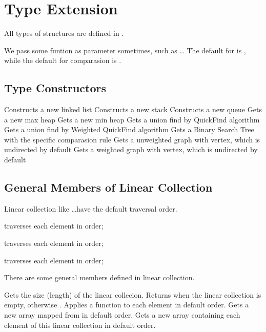 \section{Type Extension}
All types of structures are defined in .

We pass some funtion as parameter sometimes, such as  \ldots 
The default  for  is , while the default for comparasion is .

\subsection{Type Constructors}
Constructs a new linked list
Constructs a new stack
Constructs a new queue
Gets a new max heap
Gets a new min heap
Gets a union find by QuickFind algorithm
Gets a union find by Weighted QuickFind algorithm
Gets a Binary Search Tree with the specific comparasion rule
Gets a unweighted graph with  vertex, which is undirected by default
Gets a weighted graph with  vertex, which is undirected by default

\subsection{General Members of Linear Collection}
Linear collection like  \ldots have the default traversal order. 

 traverses each element in  order;

 traverses each element in  order;

 traverses each element in  order;

There are some general members defined in linear collection. 

Gets the size (length) of the linear collecion.
Returns  when the linear collection is empty, otherwise .
Applies a function to each element in default order.
Gets a new array mapped from  in default order.
Gets a new array containing each element of this linear collection in default order.

